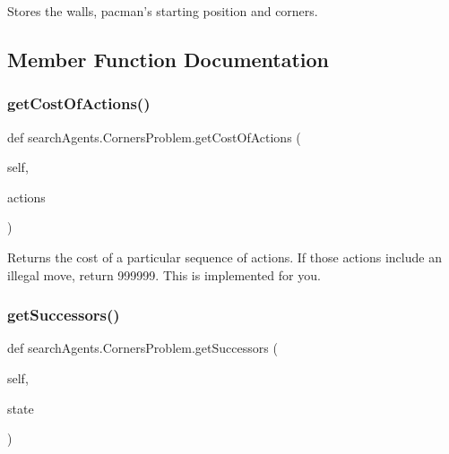\begin{DoxyVerb}Stores the walls, pacman's starting position and corners.
\end{DoxyVerb}
 

\subsection{Member Function Documentation}
\mbox{\label{classsearch_agents_1_1_corners_problem_a0530021a28c4f2e26866761ece75cec8}} 
\subsubsection{\texorpdfstring{get\+Cost\+Of\+Actions()}{getCostOfActions()}}
{\footnotesize\ttfamily def search\+Agents.\+Corners\+Problem.\+get\+Cost\+Of\+Actions (\begin{DoxyParamCaption}\item[{}]{self,  }\item[{}]{actions }\end{DoxyParamCaption})}

\begin{DoxyVerb}Returns the cost of a particular sequence of actions.  If those actions
include an illegal move, return 999999.  This is implemented for you.
\end{DoxyVerb}
 \mbox{\label{classsearch_agents_1_1_corners_problem_a9f612b359d4cd90ff87759c4ade8fbab}} 
\subsubsection{\texorpdfstring{get\+Successors()}{getSuccessors()}}
{\footnotesize\ttfamily def search\+Agents.\+Corners\+Problem.\+get\+Successors (\begin{DoxyParamCaption}\item[{}]{self,  }\item[{}]{state }\end{DoxyParamCaption})}

